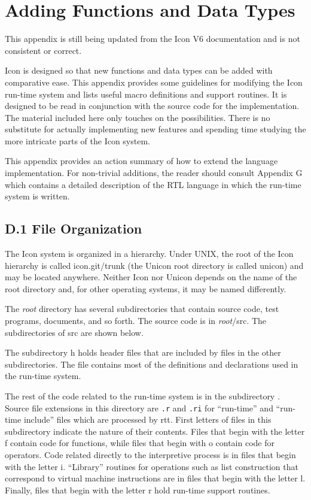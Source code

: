 \tablehead{}
\tablefirsthead{}
\tabletail{}
\tablelasttail{}

\chapter{Adding Functions and Data Types}

{\color{red} This appendix is still being updated from the Icon V6
documentation and is not consistent or correct.}

Icon is designed so that new functions and data types can be added
with comparative ease.  This appendix provides some guidelines for
modifying the Icon run-time system and lists useful macro definitions
and support routines. It is designed to be read in conjunction with
the source code for the implementation. The material included here
only touches on the possibilities. There is no substitute for actually
implementing new features and spending time studying the more
intricate parts of the Icon system.

This appendix provides an action summary of how to extend the language
implementation. For non-trivial additions, the reader should consult
Appendix G which contains a detailed description of the RTL language
in which the run-time system is written.


\section[D.1 File Organization]{D.1 File Organization}

The Icon system is organized in a hierarchy. Under UNIX, the root of
the Icon hierarchy is called icon.git/trunk {\color{blue} (the Unicon
root directory is called unicon)} and may be located anywhere.
Neither Icon nor Unicon depends on the name of the root directory and,
for other operating systems, it may be named differently.

The {\it root} directory has several subdirectories that contain
source code, test programs, documents, and so forth. The source code
is in {\it root}/src.  The subdirectories of src are shown below.

The subdirectory h holds header files that are included by files in
the other subdirectories. The file  contains most of
the definitions and declarations used in the run-time system.

The rest of the code related to the run-time system is in the
subdirectory . Source file extensions in this
directory are \texttt{.r} and \texttt{.ri} for ``run-time'' and
``run-time include'' files which are processed by rtt.
First letters of files in this
subdirectory indicate the nature of their contents. Files that begin
with the letter f contain code for functions, while files that begin
with o contain code for operators. Code related directly to the
interpretive process is in files that begin with the letter
i. ``Library'' routines for operations such as list construction that
correspond to virtual machine instructions are in files that begin
with the letter l. Finally, files that begin with the letter r hold
run-time support routines.

